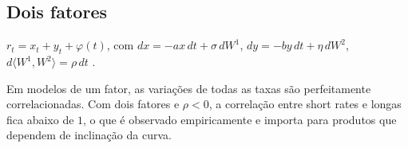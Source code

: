 \subsection{Dois fatores}

\begin{definicao}[G2++]
$r_t=x_t+y_t+\varphi(t)$, com $dx=-ax\,dt+\sigma\,dW^1$, $dy=-by\,dt+\eta\,dW^2$, $d\langle W^1,W^2\rangle=\rho\,dt$ \citep{brigomercurio2006}.
\end{definicao}

Em modelos de um fator, as variações de todas as taxas são perfeitamente correlacionadas. Com dois fatores e $\rho<0$, a correlação entre short rates e longas fica abaixo de $1$, o que é observado empiricamente e importa para produtos que dependem de inclinação da curva.
